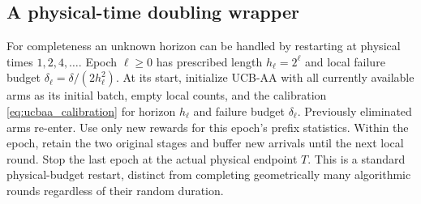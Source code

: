 \subsection{A physical-time doubling wrapper}

For completeness an unknown horizon can be handled by restarting at
physical times $1,2,4,\ldots$. Epoch $\ell\ge0$ has prescribed length
$h_\ell=2^\ell$ and local failure budget
$\delta_\ell=\delta/(2h_\ell^2)$. At its start, initialize UCB-AA with
all currently available arms as its initial batch, empty local counts,
and the calibration \eqref{eq:ucbaa_calibration} for horizon $h_\ell$
and failure budget $\delta_\ell$. Previously eliminated arms re-enter.
Use only new rewards for this epoch's prefix statistics. Within the epoch,
retain the two original stages and buffer new arrivals until the next local
round. Stop the last epoch at the actual physical endpoint $T$.
This is a standard physical-budget restart, distinct from completing
geometrically many algorithmic rounds regardless of their random duration.

